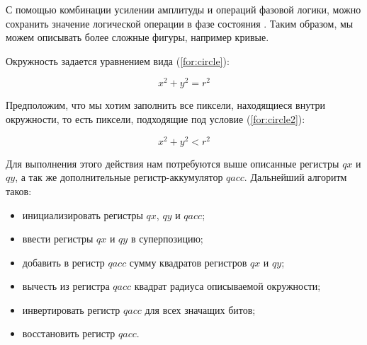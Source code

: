 С помощью комбинации усилении амплитуды и операций фазовой логики, можно сохранить значение логической операции в фазе состояния \cite{PQC-logic}. Таким образом, мы можем описывать более сложные фигуры, например кривые.

Окружность задается уравнением вида (\ref{for:circle}):

\begin{equation}
	\label{for:circle}
	x^2 + y^2 = r^2
\end{equation}

Предположим, что мы хотим заполнить все пиксели, находящиеся внутри окружности, то есть пиксели, подходящие под условие (\ref{for:circle2}):

\begin{equation}
	\label{for:circle2}
	x^2 + y^2 < r^2
\end{equation}

Для выполнения этого действия нам потребуются выше описанные регистры $qx$ и $qy$, а так же дополнительные регистр-аккумулятор $qacc$. Дальнейший алгоритм таков:

\begin{itemize}
	\item инициализировать регистры $qx$, $qy$ и $qacc$;
	\item ввести регистры $qx$ и $qy$ в суперпозицию;
	\item добавить в регистр $qacc$ сумму квадратов регистров $qx$ и $qy$;
	\item вычесть из регистра $qacc$ квадрат радиуса описываемой окружности;
	\item инвертировать регистр $qacc$ для всех значащих битов;
	\item восстановить регистр $qacc$.
\end{itemize}

